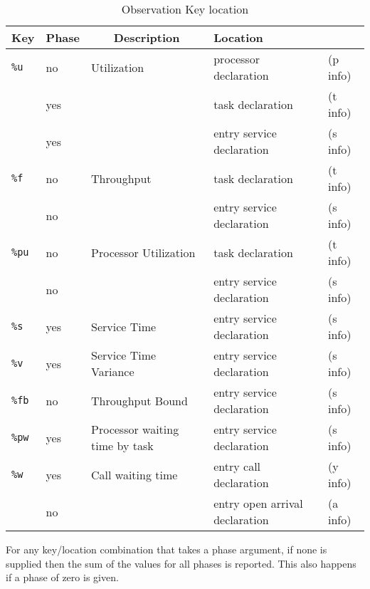 \begin{table}
  \centering
  \begin{tabular}{|l|l|l|l|l|}
    \hline
    \multicolumn{1}{|c|}{\textbf{Key}}
    &\multicolumn{1}{c|}{\textbf{Phase}}
    &\multicolumn{1}{c|}{\textbf{Description}}
    &\multicolumn{2}{l|}{\textbf{Location}}\\
\hline
  \texttt{\%u}  & no  & Utilization                    & processor declaration          & (p info) \\
                & yes &                                & task declaration               & (t info) \\
                & yes &                                & entry service declaration      & (s info) \\
\hline
  \texttt{\%f}  & no  & Throughput                     & task declaration               & (t info) \\
                & no  &                                & entry service declaration      & (s info) \\
\hline
  \texttt{\%pu} & no  & Processor Utilization          & task declaration               & (t info) \\
                & no  &                                & entry service declaration      & (s info) \\
\hline
  \texttt{\%s}  & yes & Service Time                   & entry service declaration      & (s info) \\
\hline
  \texttt{\%v}  & yes & Service Time Variance          & entry service declaration      & (s info) \\
\hline
  \texttt{\%fb} & no  & Throughput Bound               & entry service declaration      & (s info) \\
\hline
  \texttt{\%pw} & yes & Processor waiting time by task & entry service declaration      & (s info) \\
\hline
  \texttt{\%w}  & yes & Call waiting time              & entry call declaration         & (y info) \\
                & no  &                                & entry open arrival declaration & (a info) \\
\hline
  \end{tabular}
  \caption{Observation Key location}
  \label{tab:obs-location}
\end{table}

For any key/location combination that takes a phase argument, if none
is supplied then the sum of the values for all phases is reported.
This also happens if a phase of zero is given.


